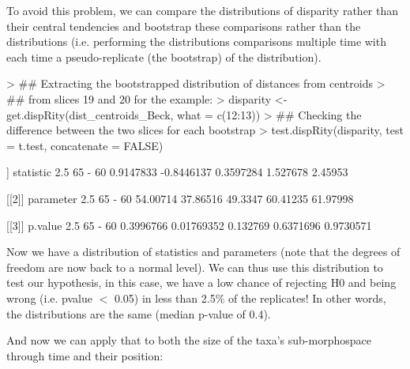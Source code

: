 \documentclass{article}
\begin{document}
To avoid this problem, we can compare the distributions of disparity rather than their central tendencies and bootstrap these comparisons rather than the distributions (i.e. performing the distributions comparisons multiple time with each time a pseudo-replicate (the bootstrap) of the distribution).

\begin{Schunk}
\begin{Sinput}
> ## Extracting the bootstrapped distribution of distances from centroids
> ## from slices 19 and 20 for the example:
> disparity <- get.dispRity(dist_centroids_Beck, what = c(12:13))
> ## Checking the difference between the two slices for each bootstrap
> test.dispRity(disparity, test = t.test, concatenate = FALSE)
\end{Sinput}
\begin{Soutput}
[[1]]
        statistic       2.5%       25%      75%   97.5%
65 - 60 0.9147833 -0.8446137 0.3597284 1.527678 2.45953

[[2]]
        parameter     2.5%     25%      75%    97.5%
65 - 60  54.00714 37.86516 49.3347 60.41235 61.97998

[[3]]
          p.value       2.5%      25%       75%     97.5%
65 - 60 0.3996766 0.01769352 0.132769 0.6371696 0.9730571
\end{Soutput}
\end{Schunk}

Now we have a distribution of statistics and parameters (note that the degrees of freedom are now back to a normal level).
We can thus use this distribution to test our hypothesis, in this case, we have a low chance of rejecting H0 and being wrong (i.e. pvalue $<$ 0.05) in less than 2.5\% of the replicates!
In other words, the distributions are the same (median p-value of 0.4).

And now we can apply that to both the size of the taxa's sub-morphospace through time and their position:
\end{document}
